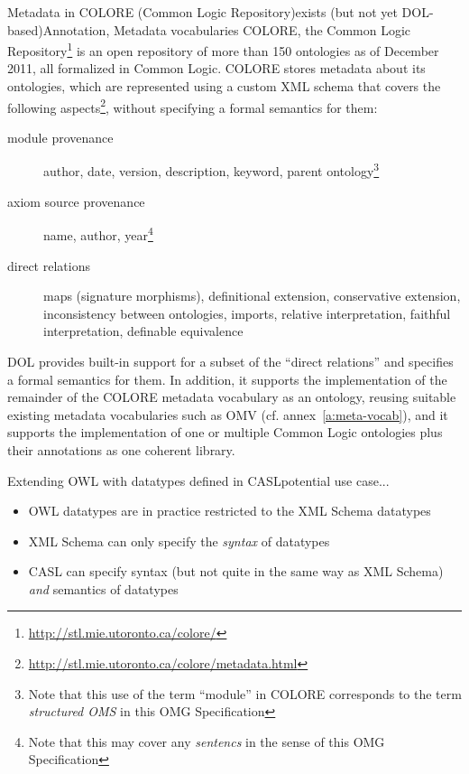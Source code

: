 \documentclass[10pt,%
\ifpretendfinal
final%
\else
draft%
\fi,
]{scrreprt}
\makeatletter
\newcommand*{\cf}{cf.\@\xspace}
\newcommand*{\termref}[1]{\textit{#1}}
\newcommand*{\IS}{OMG Specification\xspace}
\newcommand{\annexrefname}{annex}
\newcommand{\aref}[1]{\annexrefname~\ref{#1}}
\makeatother
\begin{document}
\begin{usecase}{Metadata in COLORE (Common Logic Repository)}{exists (but not yet DOL-based)}{Annotation, Metadata vocabularies}
  COLORE, the Common Logic Repository\footnote{\url{http://stl.mie.utoronto.ca/colore/}} is an open repository of more than 150 ontologies as of December 2011, all formalized in Common Logic.  COLORE stores metadata about its ontologies, which are represented using a custom XML schema that covers the following aspects\footnote{\url{http://stl.mie.utoronto.ca/colore/metadata.html}}, without specifying a formal semantics for them:
  \begin{description}
  \item[module provenance] author, date, version, description, keyword, parent ontology\footnote{Note that this use of the term ``module'' in COLORE corresponds
to the term \termref{structured OMS} in this \IS}
  \item[axiom source provenance] name, author, year\footnote{Note that this may cover any \termref{sentencs} in the sense of this \IS}
  \item[direct relations] maps (signature morphisms), definitional extension, conservative extension, inconsistency between ontologies, imports, relative interpretation, faithful interpretation, definable equivalence
  \end{description}

  DOL provides built-in support for a subset of the ``direct relations'' and specifies a formal semantics for them.  In addition, it supports the implementation of  the remainder of the COLORE metadata vocabulary as an ontology, reusing suitable existing metadata vocabularies such as OMV (\cf \aref{a:meta-vocab}), and it supports the implementation of one or multiple Common Logic ontologies plus their annotations as one coherent library.
\end{usecase}

\begin{usecase}{Extending OWL with datatypes defined in CASL}{potential use case}{...}
  \begin{itemize}
  \item OWL datatypes are in practice restricted to the XML Schema datatypes
  \item XML Schema can only specify the \emph{syntax} of datatypes
  \item CASL can specify syntax (but not quite in the same way as XML Schema) \emph{and} semantics of datatypes
  \end{itemize}
\end{usecase}
\end{document}
